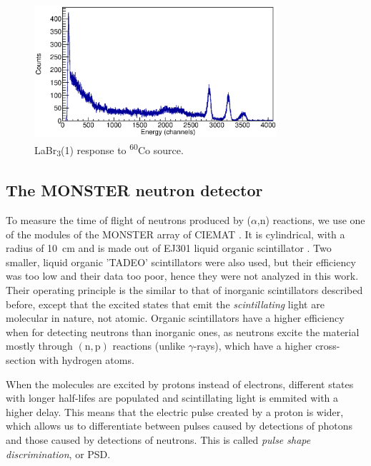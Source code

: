 \documentclass[a4paper,12pt]{report}
\newcommand{\an}{($\alpha$,n) }
\begin{document}
\begin{figure}[H]
	\centering
	\includegraphics[width=0.80\textwidth]{labr_co60_calibration.eps}
	\caption{LaBr\textsubscript{3}(1) response to \textsuperscript{60}Co source.}
	\label{labr_co60_calibration}
\end{figure}

\subsection{The MONSTER neutron detector}
To measure the time of flight of neutrons produced by \an reactions, we use one of the modules of the MONSTER array of CIEMAT \cite{MONSTER}.
It is cylindrical, with a radius of \qty{10}{\cm} and is made out of EJ301 liquid organic scintillator \cite{ej301}.
Two smaller, liquid organic 'TADEO' scintillators were also used, but their efficiency was too low and their data too poor, hence they were not analyzed in this work.
\\

Their operating principle is the similar to that of inorganic scintillators described before, except that the excited states that emit the \textit{scintillating} light are molecular in nature, not atomic.
Organic scintillators have a higher efficiency when for detecting neutrons than inorganic ones, as neutrons excite the material mostly through $\left( \text{n},\text{p}  \right)$ reactions (unlike $\gamma$-rays), which have a higher cross-section with hydrogen atoms.

When the molecules are excited by protons instead of electrons, different states with longer half-lifes are populated and scintillating light is emmited with a higher delay.
This means that the electric pulse created by a proton is wider, which allows us to differentiate between pulses caused by detections of photons and those caused by detections of neutrons.
This is called \textit{pulse shape discrimination}, or PSD.
\end{document}
